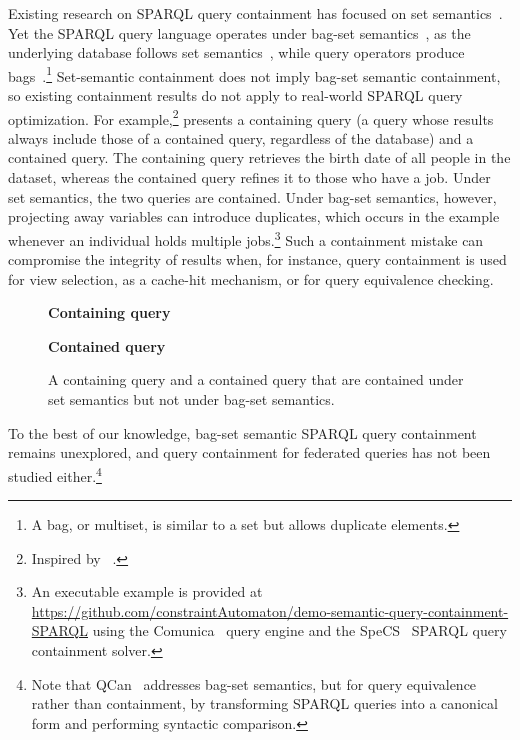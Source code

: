 Existing research on SPARQL query containment has focused on set semantics~\cite{WudageChekol2013, letelier2013static, chekol2012sparql, chekol2012sparql2, Stadler2018, jenaQC, Spasic2023}.
Yet the SPARQL query language operates under bag-set semantics~\cite{Perez2006, Angles2016, angles2026multiset}, as the underlying database follows set semantics~\cite{w3ConceptsAbstract}, while query operators produce bags~\cite{w3SPARQLQuery}.\footnote{A bag, or multiset, is similar to a set but allows duplicate elements.}
Set-semantic containment does not imply bag-set semantic containment, so existing containment results do not apply to real-world SPARQL query optimization.
For example,\footnote{Inspired by \citeauthor{Chaudhuri1993}~\cite{Chaudhuri1993}.}  presents a containing query (a query whose results always include those of a contained query, regardless of the database) and a contained query.
The containing query retrieves the birth date of all people in the dataset, whereas the contained query refines it to those who have a job.
Under set semantics, the two queries are contained.
Under bag-set semantics, however, projecting away variables can introduce duplicates, which occurs in the example whenever an individual holds multiple jobs.\footnote{An executable example is provided at \url{https://github.com/constraintAutomaton/demo-semantic-query-containment-SPARQL} using the Comunica~\cite{taelman_iswc_resources_comunica_2018} query engine and the SpeCS~\cite{Spasic2023} SPARQL query containment solver.}
Such a containment mistake can compromise the integrity of results when, for instance, query containment is used for view selection, as a cache-hit mechanism, or for query equivalence checking.

\begin{figure}[!t]
  \textbf{Containing query}
  
  \textbf{Contained query}
  
  \caption{A containing query and a contained query that are contained under set semantics but not under bag-set semantics.}
  \label{fig:bag-set-example}
\end{figure}


To the best of our knowledge, bag-set semantic SPARQL query containment remains unexplored, and query containment for federated queries has not been studied either.\footnote{Note that QCan~\cite{salas2018canonicalisation} addresses bag-set semantics, but for query equivalence rather than containment, by transforming SPARQL queries into a canonical form and performing syntactic comparison.}

